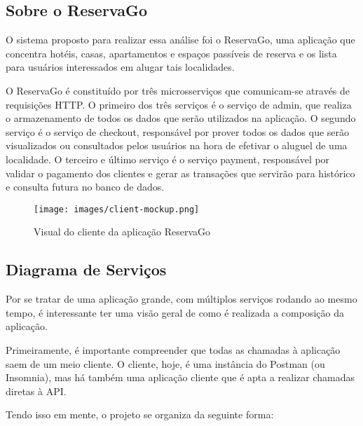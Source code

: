 \documentclass[12pt, openright, oneside, a4paper, article,
  section=TITLE
]{abntex2}
\begin{document}
\subsection{Sobre o ReservaGo}

O sistema proposto para realizar essa análise foi o ReservaGo, uma aplicação que concentra hotéis, casas, apartamentos e espaços passíveis de reserva e os lista para usuários interessados em alugar tais localidades. 

O ReservaGo é constituído por três microsserviços que comunicam-se através de requisições HTTP. O primeiro dos três serviços é o serviço de admin, que realiza o armazenamento de todos os dados que serão utilizados na aplicação. O segundo serviço é o serviço de checkout, responsável por prover todos os dados que serão visualizados ou consultados pelos usuários na hora de efetivar o aluguel de uma localidade. O terceiro e último serviço é o serviço payment, responsável por validar o pagamento dos clientes e gerar as transações que servirão para histórico e consulta futura no banco de dados. 

\begin{figure}[htb]
  \begin{center}
    \texttt{[image: images/client-mockup.png]}
  \end{center}
  \caption{Visual do cliente da aplicação ReservaGo}
\end{figure}

\subsection{Diagrama de Serviços}

Por se tratar de uma aplicação grande, com múltiplos serviços rodando ao mesmo tempo, é interessante ter uma visão geral de como é realizada a composição da aplicação. 

Primeiramente, é importante compreender que todas as chamadas à aplicação saem de um meio cliente. O cliente, hoje, é uma instância do Postman (ou Insomnia), mas há também uma aplicação cliente que é apta a realizar chamadas diretas à API. 

Tendo isso em mente, o projeto se organiza da seguinte forma:
\end{document}
